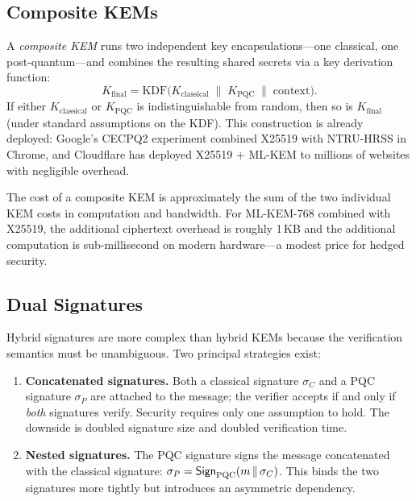 \subsection{Composite KEMs}
\label{subsec:composite-kems}

A \emph{composite KEM} runs two independent key encapsulations---one classical, one post-quantum---and combines the resulting shared secrets via a key derivation function:
\begin{equation}
\label{eq:composite-kem}
K_{\mathrm{final}} = \mathrm{KDF}\bigl(K_{\mathrm{classical}} \;\|\; K_{\mathrm{PQC}} \;\|\; \mathrm{context}\bigr).
\end{equation}
If either $K_{\mathrm{classical}}$ or $K_{\mathrm{PQC}}$ is indistinguishable from random, then so is $K_{\mathrm{final}}$ (under standard assumptions on the KDF).  This construction is already deployed: Google's CECPQ2 experiment combined X25519 with NTRU-HRSS in Chrome, and Cloudflare has deployed X25519 + ML-KEM to millions of websites with negligible overhead.

The cost of a composite KEM is approximately the sum of the two individual KEM costs in computation and bandwidth.  For ML-KEM-768 combined with X25519, the additional ciphertext overhead is roughly 1\,KB and the additional computation is sub-millisecond on modern hardware---a modest price for hedged security.

\subsection{Dual Signatures}
\label{subsec:dual-signatures}

Hybrid signatures are more complex than hybrid KEMs because the verification semantics must be unambiguous.  Two principal strategies exist:

\begin{enumerate}
\item \textbf{Concatenated signatures.}  Both a classical signature $\sigma_C$ and a PQC signature $\sigma_P$ are attached to the message; the verifier accepts if and only if \emph{both} signatures verify.  Security requires only one assumption to hold.  The downside is doubled signature size and doubled verification time.

\item \textbf{Nested signatures.}  The PQC signature signs the message concatenated with the classical signature: $\sigma_P = \mathsf{Sign}_{\mathrm{PQC}}(m \,\|\, \sigma_C)$.  This binds the two signatures more tightly but introduces an asymmetric dependency.
\end{enumerate}

